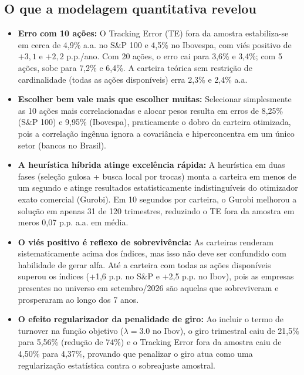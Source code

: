 \documentclass[11pt,a4paper]{article}
\begin{document}
\subsection{O que a modelagem quantitativa revelou}
\begin{itemize}[leftmargin=*]
    \item \textbf{Erro com 10 ações:} O Tracking Error (TE) fora da amostra estabiliza-se em cerca de 4,9\% a.a. no S\&P 100 e 4,5\% no Ibovespa, com viés positivo de $+3,1$ e $+2,2$ p.p./ano. Com 20 ações, o erro cai para 3,6\% e 3,4\%; com 5 ações, sobe para 7,2\% e 6,4\%. A carteira teórica sem restrição de cardinalidade (todas as ações disponíveis) erra 2,3\% e 2,4\% a.a.
    \item \textbf{Escolher bem vale mais que escolher muitas:} Selecionar simplesmente as 10 ações mais correlacionadas e alocar pesos resulta em erros de 8,25\% (S\&P 100) e 9,95\% (Ibovespa), praticamente o dobro da carteira otimizada, pois a correlação ingênua ignora a covariância e hiperconcentra em um único setor (bancos no Brasil).
    \item \textbf{A heurística híbrida atinge excelência rápida:} A heurística em duas fases (seleção gulosa + busca local por trocas) monta a carteira em menos de um segundo e atinge resultados estatisticamente indistinguíveis do otimizador exato comercial (Gurobi). Em 10 segundos por carteira, o Gurobi melhorou a solução em apenas 31 de 120 trimestres, reduzindo o TE fora da amostra em meros 0,07 p.p. a.a. em média.
    \item \textbf{O viés positivo é reflexo de sobrevivência:} As carteiras renderam sistematicamente acima dos índices, mas isso não deve ser confundido com habilidade de gerar alfa. Até a carteira com todas as ações disponíveis superou os índices (+1,6 p.p. no S\&P e +2,5 p.p. no Ibov), pois as empresas presentes no universo em setembro/2026 são aquelas que sobreviveram e prosperaram ao longo dos 7 anos.
    \item \textbf{O efeito regularizador da penalidade de giro:} Ao incluir o termo de turnover na função objetivo ($\lambda = 3.0$ no Ibov), o giro trimestral caiu de 21,5\% para 5,56\% (redução de 74\%) e o Tracking Error fora da amostra caiu de 4,50\% para 4,37\%, provando que penalizar o giro atua como uma regularização estatística contra o sobreajuste amostral.
\end{itemize}
\end{document}
